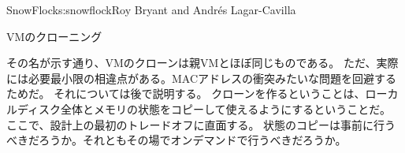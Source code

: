 \begin{aosachapter}{SnowFlock}{s:snowflock}{Roy Bryant and Andr\'e{s} Lagar-Cavilla}
\begin{aosasect1}{VMのクローニング}

その名が示す通り、VMのクローンは親VMとほぼ同じものである。
ただ、実際には必要最小限の相違点がある。MACアドレスの衝突みたいな問題を回避するためだ。
それについては後で説明する。
クローンを作るということは、ローカルディスク全体とメモリの状態をコピーして使えるようにするということだ。
ここで、設計上の最初のトレードオフに直面する。
状態のコピーは事前に行うべきだろうか。それともその場でオンデマンドで行うべきだろうか。


\end{aosasect1}
\end{aosachapter}

